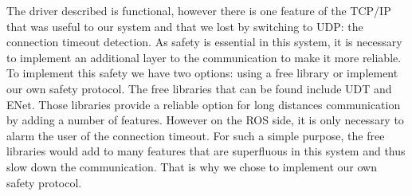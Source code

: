 







The driver described is functional, however there is one feature of the TCP/IP that was useful to our system and that we lost by switching to UDP: the connection timeout detection. As safety is essential in this system, it is necessary to implement an additional layer to the communication to make it more reliable. To implement this safety we have two options: using a free library or implement our own safety protocol. The free libraries that can be found include UDT\cite{UDT} and ENet\cite{ENet}. Those libraries provide a reliable option for long distances communication by adding a number of features. However on the ROS side, it is only necessary to alarm the user of the connection timeout. For such a simple purpose, the free libraries would add to many features that are superfluous in this system and thus slow down the communication. That is why we chose to implement our own safety protocol.

